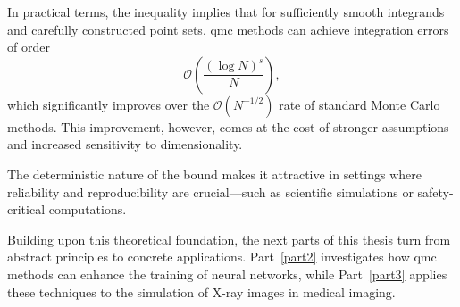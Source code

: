 In practical terms, the inequality implies that for sufficiently smooth integrands and carefully constructed point sets, \ac{qmc} methods can achieve integration errors of order
\[
\mathcal{O}\left( \frac{(\log N)^s}{N} \right),
\]
which significantly improves over the $\mathcal{O}(N^{-1/2})$ rate of standard Monte Carlo methods. This improvement, however, comes at the cost of stronger assumptions and increased sensitivity to dimensionality.

\begin{remark}
The deterministic nature of the bound makes it attractive in settings where reliability and reproducibility are crucial—such as scientific simulations or safety-critical computations.
\end{remark}

\qquad

Building upon this theoretical foundation, the next parts of this thesis turn
from abstract principles to concrete applications. Part~\ref{part2} investigates
how \ac{qmc} methods can enhance the training of neural networks, while
Part~\ref{part3} applies these techniques to the simulation of X-ray images in
medical imaging.










